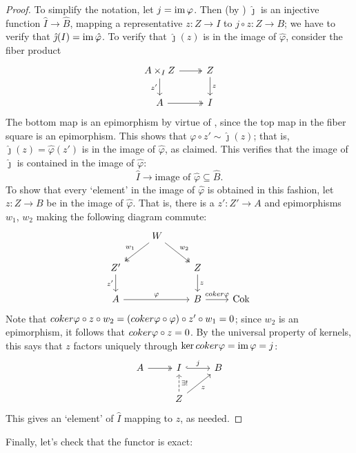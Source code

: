 \begin{proof}
  To simplify the notation, let $j = \operatorname{im}\varphi$. Then (by
  ) $\hat{\jmath}$ is an injective function
  $\hat{I} \to \hat{B}$, mapping a representative $z : Z \to I$ to
  $j \circ z : Z \to B$; we have to verify that
  $\hat{\jmath}(I) = \operatorname{im}\hat{\varphi}$. To verify that
  $\hat{\jmath}(z)$ is in the image of $\hat{\varphi}$, consider the
  fiber product
  \[\begin{tikzcd}
      A \times_I Z \arrow[r, two heads] \arrow[d, "z'"'] & Z \arrow[d, "z"] \\
      A \arrow[r, two heads] & I
    \end{tikzcd}\] The bottom map is an epimorphism by virtue of
  , since the top map in the fiber square is an
  epimorphism. This shows that
  $\varphi \circ z' \sim \hat{\jmath}(z)$; that is,
  $\hat{\jmath}(z) = \hat{\varphi}(z')$ is in the image of
  $\hat{\varphi}$, as claimed. This verifies that the image of
  $\hat{\jmath}$ is contained in the image of $\hat{\varphi}$:
  \[
    \hat{I} \to \text{image of } \hat{\varphi} \subseteq \hat{B}.
  \]
  To show that every `element' in the image of $\hat{\varphi}$ is
  obtained in this fashion, let $z : Z \to B$ be in the image of
  $\hat{\varphi}$. That is, there is a $z' : Z' \to A$ and
  epimorphisms $w_1$, $w_2$ making the following diagram commute:
  \[\begin{tikzcd}
      & W \arrow[dl, two heads, "w_1"'] \arrow[dr, two heads, "w_2"] & \\
      Z' \arrow[d, "z'"'] & & Z \arrow[d, "z"] \\
      A \arrow[rr, "\varphi"] & & B \arrow[r, "\coker\varphi"] &
      \operatorname{Cok}
    \end{tikzcd}\] Note that
  $coker\varphi \circ z \circ w_2 = (coker\varphi \circ \varphi)
  \circ z' \circ w_1 = 0$; since $w_2$ is an epimorphism, it follows
  that $coker\varphi \circ z = 0$. By the universal property of
  kernels, this says that $z$ factors uniquely through
  $\ker coker\varphi = \operatorname{im}\varphi = j$:
  \[\begin{tikzcd}
      A \arrow[r, two heads] & I \arrow[r, "j", hook] & B \\
      & Z \arrow[u, dashed, "\exists!"'] \arrow[ur, "z"'] &
    \end{tikzcd}\] This gives an `element' of $\hat{I}$ mapping to
  $z$, as needed.
\end{proof}

Finally, let's check that the functor is exact:

